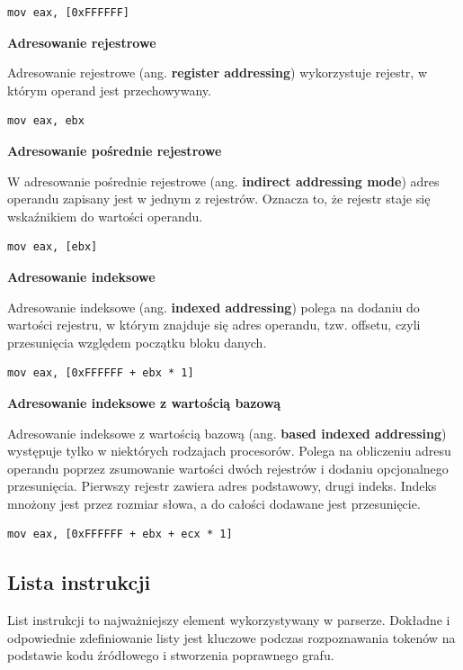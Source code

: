 \documentclass[a4paper,12pt]{article}
\begin{document}
\begin{lstlisting}
mov eax, [0xFFFFFF]
\end{lstlisting}

\textbf{Adresowanie rejestrowe}

Adresowanie rejestrowe (ang. \textbf{register addressing}) wykorzystuje rejestr, w którym operand jest przechowywany.

\begin{lstlisting}
mov eax, ebx
\end{lstlisting}

\textbf{Adresowanie pośrednie rejestrowe}

W adresowanie pośrednie rejestrowe (ang. \textbf{indirect addressing mode}) adres operandu zapisany jest w jednym z rejestrów. Oznacza to, że rejestr staje się wskaźnikiem do wartości operandu.

\begin{lstlisting}
mov eax, [ebx]
\end{lstlisting}

\textbf{Adresowanie indeksowe}

Adresowanie indeksowe (ang. \textbf{indexed addressing}) polega na dodaniu do wartości rejestru, w którym znajduje się adres operandu, tzw. offsetu, czyli przesunięcia względem początku bloku danych.

\begin{lstlisting}
mov eax, [0xFFFFFF + ebx * 1]
\end{lstlisting}

\textbf{Adresowanie indeksowe z wartością bazową}

Adresowanie indeksowe z wartością bazową (ang. \textbf{based indexed addressing}) występuje tylko w niektórych rodzajach procesorów. Polega na obliczeniu adresu operandu poprzez zsumowanie wartości dwóch rejestrów i dodaniu opcjonalnego przesunięcia. Pierwszy rejestr zawiera adres podstawowy, drugi indeks. Indeks mnożony jest przez rozmiar słowa, a do całości dodawane jest przesunięcie.

\begin{lstlisting}
mov eax, [0xFFFFFF + ebx + ecx * 1]
\end{lstlisting}

\subsection{Lista instrukcji}

List instrukcji to najważniejszy element wykorzystywany w parserze. Dokładne i odpowiednie zdefiniowanie listy jest kluczowe podczas rozpoznawania tokenów na podstawie kodu źródłowego i stworzenia poprawnego grafu.
\end{document}
